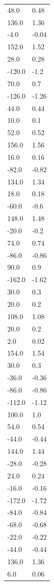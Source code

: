 \begin{longtable}{ll}
48.0 & 0.48 \\
136.0 & 1.36 \\
-4.0 & -0.04 \\
152.0 & 1.52 \\
28.0 & 0.28 \\
-120.0 & -1.2 \\
70.0 & 0.7 \\
-126.0 & -1.26 \\
44.0 & 0.44 \\
10.0 & 0.1 \\
52.0 & 0.52 \\
156.0 & 1.56 \\
16.0 & 0.16 \\
-82.0 & -0.82 \\
134.0 & 1.34 \\
18.0 & 0.18 \\
-60.0 & -0.6 \\
148.0 & 1.48 \\
-20.0 & -0.2 \\
74.0 & 0.74 \\
-86.0 & -0.86 \\
90.0 & 0.9 \\
-162.0 & -1.62 \\
30.0 & 0.3 \\
20.0 & 0.2 \\
108.0 & 1.08 \\
20.0 & 0.2 \\
2.0 & 0.02 \\
154.0 & 1.54 \\
30.0 & 0.3 \\
-36.0 & -0.36 \\
-86.0 & -0.86 \\
-112.0 & -1.12 \\
100.0 & 1.0 \\
54.0 & 0.54 \\
-44.0 & -0.44 \\
144.0 & 1.44 \\
-28.0 & -0.28 \\
24.0 & 0.24 \\
-16.0 & -0.16 \\
-172.0 & -1.72 \\
-84.0 & -0.84 \\
-68.0 & -0.68 \\
-22.0 & -0.22 \\
-44.0 & -0.44 \\
136.0 & 1.36 \\
6.0 & 0.06 \\

\end{longtable}
